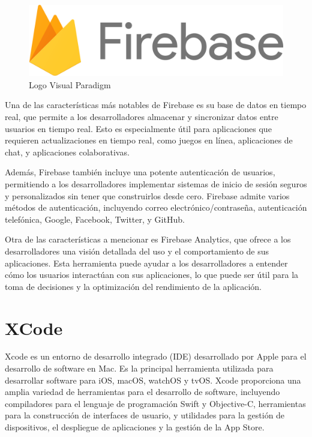     \begin{figure}[H]
        \centering
        \includegraphics[width=.5\linewidth]{images/1280px-Firebase_Logo.svg.png}
        \caption{Logo Visual Paradigm}
        \label{fig:my_label}
    \end{figure}

    Una de las características más notables de Firebase es su base de datos en tiempo real, que permite a los desarrolladores almacenar y sincronizar datos entre usuarios en tiempo real. Esto es especialmente útil para aplicaciones que requieren actualizaciones en tiempo real, como juegos en línea, aplicaciones de chat, y aplicaciones colaborativas.

    Además, Firebase también incluye una potente autenticación de usuarios, permitiendo a los desarrolladores implementar sistemas de inicio de sesión seguros y personalizados sin tener que construirlos desde cero. Firebase admite varios métodos de autenticación, incluyendo correo electrónico/contraseña, autenticación telefónica, Google, Facebook, Twitter, y GitHub.

    Otra de las características a mencionar es Firebase Analytics, que ofrece a los desarrolladores una visión detallada del uso y el comportamiento de sus aplicaciones. Esta herramienta puede ayudar a los desarrolladores a entender cómo los usuarios interactúan con sus aplicaciones, lo que puede ser útil para la toma de decisiones y la optimización del rendimiento de la aplicación.
    
    \section{XCode}

    Xcode es un entorno de desarrollo integrado (IDE) desarrollado por Apple para el desarrollo de software en Mac. Es la principal herramienta utilizada para desarrollar software para iOS, macOS, watchOS y tvOS. Xcode proporciona una amplia variedad de herramientas para el desarrollo de software, incluyendo compiladores para el lenguaje de programación Swift y Objective-C, herramientas para la construcción de interfaces de usuario, y utilidades para la gestión de dispositivos, el despliegue de aplicaciones y la gestión de la App Store.

